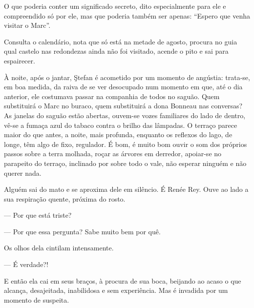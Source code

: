 
O que poderia conter um significado secreto, dito especialmente para ele
e compreendido só por ele, mas que poderia também ser apenas: ``Espero
que venha visitar o Marc''.


Consulta o calendário, nota que só está na metade de agosto, procura no
guia qual castelo nas redondezas ainda não foi visitado, acende o pito e
sai para espairecer.

\asterisc

À noite, após o jantar, Ştefan é acometido por um momento de angústia:
trata-se, em boa medida, da raiva de se ver desocupado num momento em
que, até o dia anterior, ele costumava passar na companhia de todos no
saguão. Quem substituirá o Marc no buraco, quem substituirá a dona
Bonneau nas conversas? As janelas do saguão estão abertas, ouvem-se
vozes familiares do lado de dentro, vê-se a fumaça azul do tabaco contra
o brilho das lâmpadas. O terraço parece maior do que antes, a noite,
mais profunda, enquanto os reflexos do lago, de longe, têm algo de fixo,
regulador. É bom, é muito bom ouvir o som dos próprios passos sobre a
terra molhada, roçar as árvores em derredor, apoiar-se no parapeito do
terraço, inclinado por sobre todo o vale, não esperar ninguém e não
querer nada.

Alguém sai do mato e se aproxima dele em silêncio. É Renée Rey. Ouve ao lado a sua respiração quente, próxima do rosto.

--- Por que está triste?


--- Por que essa pergunta? Sabe muito bem por quê.

Os olhos dela cintilam intensamente.

--- É verdade?!

E então ela cai em seus braços, à procura de sua boca, beijando ao acaso
o que alcança, desajeitada, inabilidosa e sem experiência. Mas é
invadida por um momento de suspeita.

